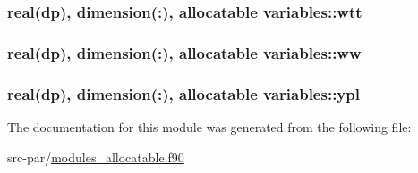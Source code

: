 \hypertarget{classvariables_a4f678b6d108e9e935a12868acd75d049}{
\subsubsection[{wtt}]{\setlength{\rightskip}{0pt plus 5cm}real(dp), dimension(\-:), allocatable variables\-::wtt}}\label{classvariables_a4f678b6d108e9e935a12868acd75d049}
\hypertarget{classvariables_a4bda49dd30eadb3c0436d59272fb703f}{
\subsubsection[{ww}]{\setlength{\rightskip}{0pt plus 5cm}real(dp), dimension(\-:), allocatable variables\-::ww}}\label{classvariables_a4bda49dd30eadb3c0436d59272fb703f}
\hypertarget{classvariables_aa28eada2885d956e6f235e13deeee5f3}{
\subsubsection[{ypl}]{\setlength{\rightskip}{0pt plus 5cm}real(dp), dimension(\-:), allocatable variables\-::ypl}}\label{classvariables_aa28eada2885d956e6f235e13deeee5f3}


The documentation for this module was generated from the following file\-:\begin{DoxyCompactItemize}
\item 
src-\/par/\hyperlink{modules__allocatable_8f90}{modules\-\_\-allocatable.\-f90}\end{DoxyCompactItemize}
